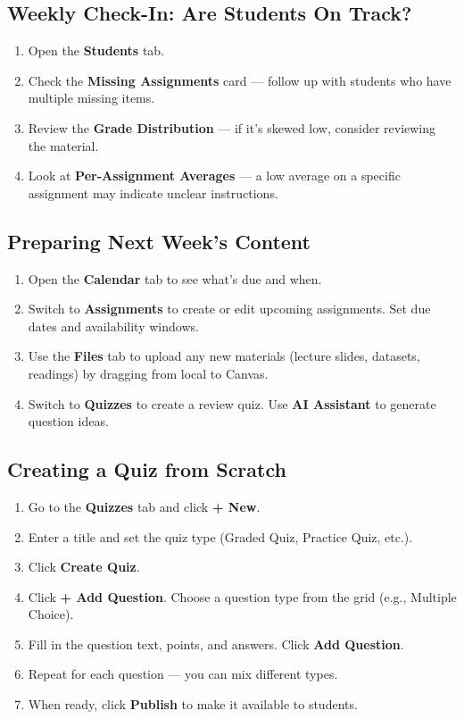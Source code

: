 \documentclass[12pt,letterpaper]{article}
\begin{document}
\subsection{Weekly Check-In: Are Students On Track?}

\begin{enumerate}[leftmargin=*]
    \item Open the \textbf{Students} tab.
    \item Check the \textbf{Missing Assignments} card — follow up with students who have multiple missing items.
    \item Review the \textbf{Grade Distribution} — if it's skewed low, consider reviewing the material.
    \item Look at \textbf{Per-Assignment Averages} — a low average on a specific assignment may indicate unclear instructions.
\end{enumerate}

\subsection{Preparing Next Week's Content}

\begin{enumerate}[leftmargin=*]
    \item Open the \textbf{Calendar} tab to see what's due and when.
    \item Switch to \textbf{Assignments} to create or edit upcoming assignments. Set due dates and availability windows.
    \item Use the \textbf{Files} tab to upload any new materials (lecture slides, datasets, readings) by dragging from local to Canvas.
    \item Switch to \textbf{Quizzes} to create a review quiz. Use \textbf{AI Assistant} to generate question ideas.
\end{enumerate}

\subsection{Creating a Quiz from Scratch}

\begin{enumerate}[leftmargin=*]
    \item Go to the \textbf{Quizzes} tab and click \textbf{+ New}.
    \item Enter a title and set the quiz type (Graded Quiz, Practice Quiz, etc.).
    \item Click \textbf{Create Quiz}.
    \item Click \textbf{+ Add Question}. Choose a question type from the grid (e.g., Multiple Choice).
    \item Fill in the question text, points, and answers. Click \textbf{Add Question}.
    \item Repeat for each question --- you can mix different types.
    \item When ready, click \textbf{Publish} to make it available to students.
\end{enumerate}
\end{document}
